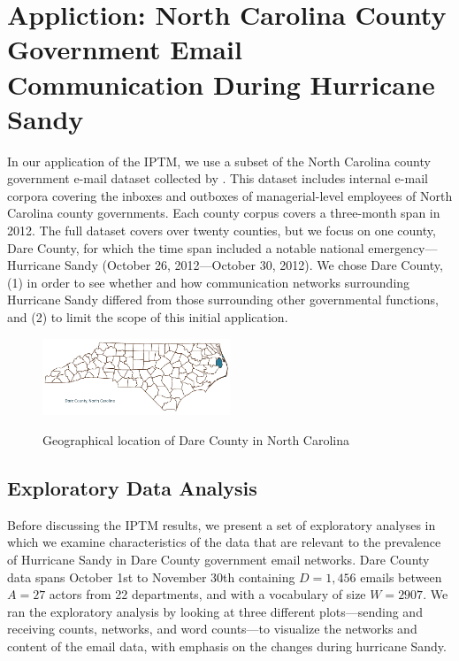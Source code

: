  \section{Appliction: North Carolina County Government Email \\ Communication During Hurricane Sandy}  \label{sec: Application to North Carolina email data}
In our application of the IPTM, we use a subset of the North Carolina county government e-mail dataset collected by \citet{ben2017transparency}. This dataset includes internal e-mail corpora covering the inboxes and outboxes of managerial-level employees of North Carolina county governments. Each county corpus covers a three-month span in 2012. The full dataset covers over twenty counties, but we focus on one county, Dare County, for which the time span included a notable national emergency---Hurricane Sandy (October 26, 2012---October 30, 2012). We chose Dare County, (1) in order to see whether and how communication networks surrounding Hurricane Sandy differed from those surrounding other governmental functions, and (2) to limit the scope of this initial application.
  \begin{figure}[ht]
  	\centering
  	     	\includegraphics[width=0.5\textwidth]{plots/Dare.png} 
  	\label{fig:VanceDare}
  	\caption{Geographical location of Dare County in North Carolina}
  \end{figure}
 \subsection{Exploratory Data Analysis} \label{subsec: EDA}
 
Before discussing the IPTM results, we present a set of exploratory analyses in which we examine characteristics of the data that are relevant to the prevalence of Hurricane Sandy in Dare County government email networks. Dare County data spans October 1st to November 30th containing $D=1,456$ emails between $A=27$ actors from 22 departments, and with a vocabulary of size $W=2907$. We ran the exploratory analysis by looking at three different plots---sending and receiving counts, networks, and word counts---to visualize the networks and content of the email data, with emphasis on the changes during hurricane Sandy.
    
